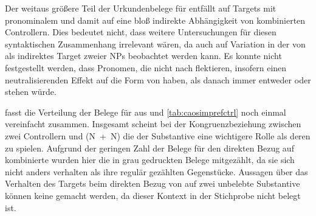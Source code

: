 Der weitaus größere Teil der Urkundenbelege für  entfällt auf
Targets mit pro\-nomi\-nalem  und damit auf eine bloß indirekte
Abhängigkeit von kombinierten Controllern. Dies bedeutet nicht,
dass weitere Untersuchungen für diesen syntaktischen Zusammenhang irrelevant
wären, da auch auf  Variation in der  von
 als indirektes Target zweier NPs beobachtet werden kann. Es konnte
nicht festgestellt werden, dass Pronomen, die nicht nach 
flektieren, insofern einen neutralisierenden Effekt auf die Form von
 haben, als danach immer entweder  oder 
stehen würde.

 fasst die Verteilung
der Belege für  aus  und
\ref{tab:caosimprefctrl} noch einmal vereinfacht zusammen. Insgesamt scheint
bei der Kongruenzbeziehung zwischen zwei
Controllern und  (N~+~N) die
 der Substantive eine wichtigere Rolle als deren  zu
spielen. Aufgrund der geringen Zahl der Belege für den direkten Bezug auf
kombinierte  wurden hier die in  grau
gedruckten Belege mitgezählt, da sie sich nicht anders verhalten als ihre
regulär gezählten Gegenstücke. Aussagen über das Verhalten des Targets beim
direkten Bezug von  auf zwei unbelebte Substantive
können keine gemacht werden, da dieser Kontext in der Stichprobe nicht belegt
ist.

